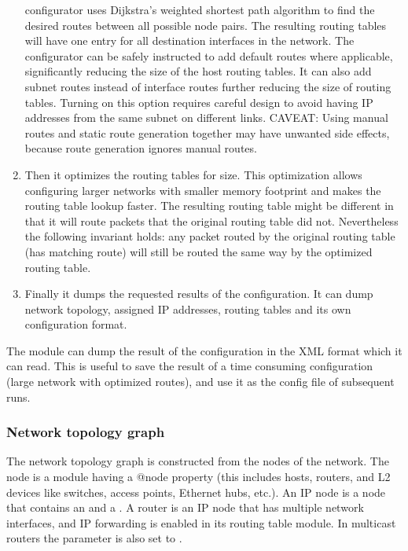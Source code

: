 \begin{enumerate}
     configurator uses Dijkstra's weighted shortest path algorithm to find
     the desired routes between all possible node pairs. The resulting
     routing tables will have one entry for all destination interfaces in the
     network. The configurator can be safely instructed to add default routes
     where applicable, significantly reducing the size of the host routing
     tables. It can also add subnet routes instead of interface routes further
     reducing the size of routing tables. Turning on this option requires
     careful design to avoid having IP addresses from the same subnet on
     different links. CAVEAT: Using manual routes and static route generation
     together may have unwanted side effects, because route generation ignores
     manual routes.
  \item  Then it optimizes the routing tables for size. This optimization allows
     configuring larger networks with smaller memory footprint and makes the
     routing table lookup faster. The resulting routing table might be
     different in that it will route packets that the original routing table
     did not. Nevertheless the following invariant holds: any packet routed
     by the original routing table (has matching route) will still be routed
     the same way by the optimized routing table.
  \item  Finally it dumps the requested results of the configuration. It can
     dump network topology, assigned IP addresses, routing tables and its
     own configuration format.
\end{enumerate}

The module can dump the result of the configuration in the XML format
which it can read. This is useful to save the result of a time consuming
configuration (large network with optimized routes), and use it as
the config file of subsequent runs.

\subsubsection*{Network topology graph}

The network topology graph is constructed from the nodes
of the network. The node is a module having a @node property
(this includes hosts, routers, and L2 devices like switches,
 access points, Ethernet hubs, etc.). An IP node is a node
that contains an  and a .
A router is an IP node that has multiple network interfaces,
and IP forwarding is enabled in its routing table module.
In multicast routers the  parameter
is also set to .

